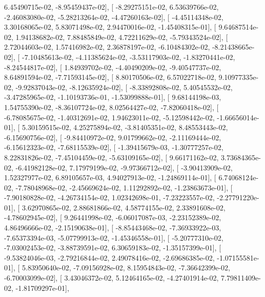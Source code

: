 \documentclass{article}
\begin{document}
          6.45490715e-02,  -8.95459437e-02],
       [ -8.29275151e-02,   6.53639766e-02,  -2.46083080e-02,
         -5.28213264e-02,  -4.47260163e-02],
       [ -4.45114348e-02,   3.30168065e-02,   5.83071498e-02,
          2.94470016e-02,  -1.45408315e-01],
       [  9.64687514e-02,   1.94138682e-02,   7.88485849e-02,
          4.72211629e-02,  -5.79343524e-02],
       [  2.72044603e-02,   1.57416982e-02,   2.36878197e-02,
         -6.10484302e-02,  -8.21438665e-02],
       [ -7.10485613e-02,  -4.11385624e-02,  -3.53117903e-02,
         -1.83270441e-02,  -8.24544817e-02],
       [  1.84939702e-02,  -4.40490209e-02,  -9.40547737e-02,
          8.64891594e-02,  -7.71593145e-02],
       [  8.80170506e-02,   6.57022718e-02,   9.10977335e-02,
         -9.92837043e-02,  -8.12635924e-02],
       [ -8.33892808e-02,   5.40545532e-02,  -3.47285965e-02,
         -1.10193736e-01,  -1.53099888e-01],
       [  9.68144198e-03,   1.54755390e-02,  -8.36107724e-02,
          8.02564427e-02,  -7.82060418e-02],
       [ -6.78085675e-02,  -1.40312691e-02,   1.94623011e-02,
         -5.12598442e-02,  -1.66656014e-01],
       [  5.30159515e-02,   4.25275894e-02,  -3.81405351e-02,
          8.48553443e-02,  -6.15690756e-02],
       [ -9.84410972e-02,   9.01799662e-02,  -2.11169444e-02,
         -6.15612323e-02,  -7.68115539e-02],
       [ -1.39415679e-03,  -1.30777257e-02,   8.22831826e-02,
         -7.45104459e-02,  -5.63109165e-02],
       [  9.66171162e-02,   3.73684365e-02,  -6.41982128e-02,
          7.17979199e-02,  -9.97366712e-02],
       [ -3.90413909e-02,   1.52327977e-02,   6.89105657e-03,
          4.94027913e-02,  -1.24869114e-01],
       [  6.74068124e-02,  -7.78048968e-02,  -2.45669624e-02,
          1.11292892e-02,  -1.23863673e-01],
       [ -7.90180828e-02,  -4.26734154e-02,   1.02342698e-01,
         -7.23223557e-02,  -2.27791220e-01],
       [  3.62970865e-02,   2.88681866e-02,   4.58774155e-02,
          2.33891608e-02,  -4.78602945e-02],
       [  9.26441998e-02,  -6.06017087e-03,  -2.23152389e-02,
          4.86496666e-02,  -2.15190638e-01],
       [ -8.85443468e-02,  -7.36933922e-03,  -7.65373394e-03,
         -5.07799913e-02,  -1.45346558e-01],
       [ -5.20777310e-02,  -7.03002453e-02,  -3.88739591e-02,
          6.30659183e-02,  -1.35157399e-01],
       [ -9.53824046e-03,  -2.79216844e-02,   2.49078416e-02,
         -2.69686385e-02,  -1.07155581e-01],
       [  5.83950640e-02,  -7.09156928e-02,   8.15954843e-02,
         -7.36642399e-02,  -6.70003099e-02],
       [  3.43046372e-02,   5.12464165e-02,  -4.27401914e-02,
          7.79811409e-02,  -1.81709297e-01],
\end{document}
